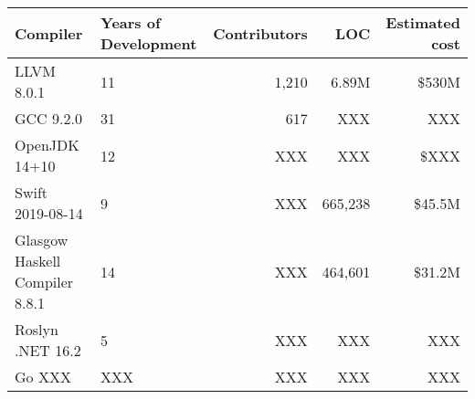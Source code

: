 \begin{tabular}{ | L{4cm} | R{2.5cm} r r r |}
  \hline
  \textbf{Compiler} & \textbf{Years of Development} & \textbf{Contributors} & \textbf{LOC} & \textbf{Estimated cost} \\
  \hline
  LLVM 8.0.1 & 11 & 1,210 & 6.89M & \$530M \\
  GCC 9.2.0 & 31 & 617 & XXX & XXX \\
  OpenJDK 14+10 & 12 & XXX & XXX & \$XXX \\
  Swift 2019-08-14 & 9 & XXX & 665,238 & \$45.5M \\
  Glasgow Haskell Compiler 8.8.1 & 14 & XXX & 464,601 & \$31.2M \\
  Roslyn .NET 16.2 & 5 & XXX & XXX & XXX \\
  Go XXX & XXX & XXX & XXX & XXX \\
  \hline
\end{tabular}
